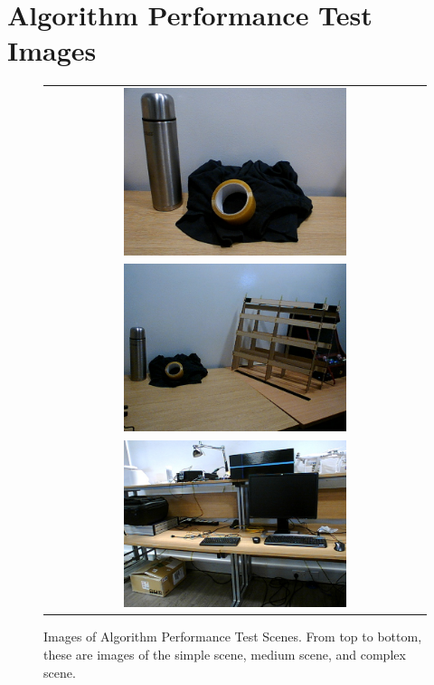 \chapter{Algorithm Performance Test Images}
\label{Appendix:scenes}
        
\begin{figure}[ht]
    \begin{center}
    \begin{tabular}{ c }
        \includegraphics[width=0.6\textwidth]{Figures/simple.jpg} \\
        \includegraphics[width=0.6\textwidth]{Figures/medium.jpg} \\
        \includegraphics[width=0.6\textwidth]{Figures/complex.jpg} 
    \end{tabular}
    \caption[Images of Algorithm Performance Test Scenes]{Images of Algorithm Performance Test Scenes. From top to bottom, these are images of the simple scene, medium scene, and complex scene.}
    \label{fig:scenes}
    \end{center}
\end{figure}